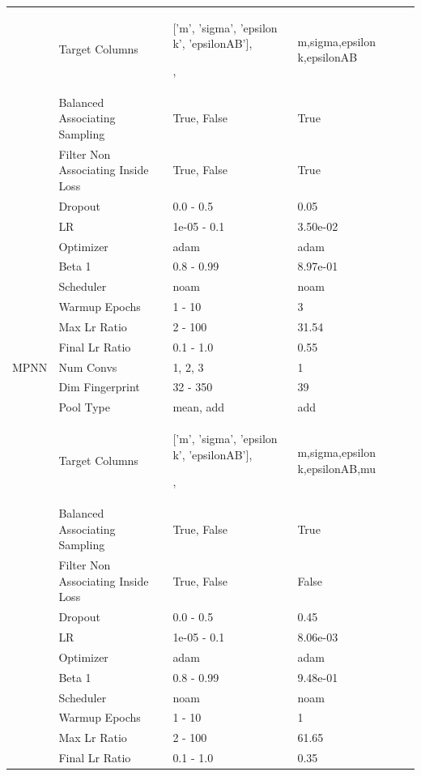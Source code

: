 \begin{table}
\begin{center}
\begin{tabular}{lp{}p{}l}
			 & Target Columns & ['m', 'sigma', 'epsilon k', 'epsilonAB'],\par['m', 'sigma', 'epsilon k', 'epsilonAB', 'KAB'],\par['m', 'sigma', 'epsilon k', 'epsilonAB', 'mu'] & m,sigma,epsilon k,epsilonAB \\
			 & Balanced Associating Sampling & True, False & True \\
			 & Filter Non Associating Inside Loss & True, False & True \\
			 & Dropout & 0.0 - 0.5 & 0.05 \\
			 & LR & 1e-05 - 0.1 & 3.50e-02 \\
			 & Optimizer & adam & adam \\
			 & Beta 1 & 0.8 - 0.99 & 8.97e-01 \\
			 & Scheduler & noam & noam \\
			 & Warmup Epochs & 1 - 10 & 3 \\
			 & Max Lr Ratio & 2 - 100 & 31.54 \\
			 & Final Lr Ratio & 0.1 - 1.0 & 0.55 \\
			MPNN & Num Convs & 1, 2, 3 & 1 \\
			 & Dim Fingerprint & 32 - 350 & 39 \\
			 & Pool Type & mean, add & add \\
			 & Target Columns & ['m', 'sigma', 'epsilon k', 'epsilonAB'],\par['m', 'sigma', 'epsilon k', 'epsilonAB', 'KAB'],\par['m', 'sigma', 'epsilon k', 'epsilonAB', 'mu'] & m,sigma,epsilon k,epsilonAB,mu \\
			 & Balanced Associating Sampling & True, False & True \\
			 & Filter Non Associating Inside Loss & True, False & False \\
			 & Dropout & 0.0 - 0.5 & 0.45 \\
			 & LR & 1e-05 - 0.1 & 8.06e-03 \\
			 & Optimizer & adam & adam \\
			 & Beta 1 & 0.8 - 0.99 & 9.48e-01 \\
			 & Scheduler & noam & noam \\
			 & Warmup Epochs & 1 - 10 & 1 \\
			 & Max Lr Ratio & 2 - 100 & 61.65 \\
			 & Final Lr Ratio & 0.1 - 1.0 & 0.35 \\
		\end{tabular}
	\end{center}
	\label{tab:hyperparameters}
\end{table}

